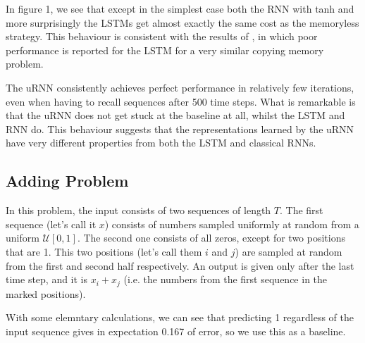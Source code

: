 \documentclass{article} %
\begin{document}
In figure 1, we see that except in the simplest case both the RNN with tanh and more surprisingly 
the LSTMs get almost exactly the same cost as the memoryless strategy. This behaviour is consistent 
with the results of \cite{NTM}, in which poor performance is reported for the LSTM for a very similar 
copying memory problem.

The uRNN consistently achieves perfect performance in relatively few iterations, even when having to recall
sequences after 500 time steps. What is remarkable is that the uRNN does not get stuck at the baseline at 
all, whilst the LSTM and RNN do. This behaviour suggests that the representations learned by the uRNN
have very different properties from both the LSTM and classical RNNs. 

\subsection{Adding Problem}
In this problem, the input consists of two sequences of length $T$. The first sequence (let's call it $x$) consists of numbers sampled uniformly at random from a uniform $\mathcal{U}[0,1]$. The second one consists of all zeros, except for two positions that are 1. This two positions (let's call them $i$ and $j$) are sampled at random from the first and second half respectively. An output is given only after the last time step, and it is $x_i + x_j$ (i.e. the numbers from the first sequence in the marked positions).

With some elemntary calculations, we can see that predicting 1 regardless of the input sequence gives in expectation 0.167 of error, so we use this as a baseline.
\end{document}
